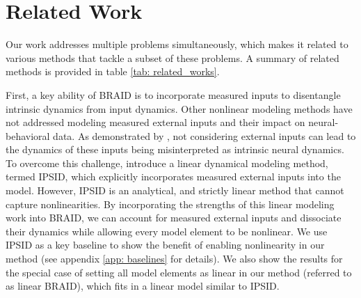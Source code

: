 \documentclass{article} %
\newcommand{\ourmethod}{BRAID}
\newcommand{\ourmethodlinear}{linear \ourmethod}
\begin{document}
\section{Related Work}\label{sec: related_work}
Our work addresses multiple problems simultaneously, which makes it related to various methods that tackle a subset of these problems. A summary of related methods is provided in table \ref{tab: related_works}.

First, a key ability of \ourmethod{} is to incorporate measured inputs to disentangle intrinsic dynamics from input dynamics. Other nonlinear modeling methods \citep{gao2016linear, sussillo2016making, wu2017gaussian, pandarinath2018inferring, rutten2020non, hurwitz2021targeted, kim2021inferring, abbaspourazad2024dynamical, sani2024dissociative} have not addressed modeling measured external inputs and their impact on neural-behavioral data. As demonstrated by \citet{vahidi2024modeling}, not considering external inputs can lead to the dynamics of these inputs being misinterpreted as intrinsic neural dynamics. To overcome this challenge, \cite{vahidi2024modeling} introduce a linear dynamical modeling method, termed IPSID, which explicitly incorporates measured external inputs into the model. However, IPSID is an analytical, and strictly linear method that cannot capture nonlinearities. By incorporating the strengths of this linear modeling work into \ourmethod{}, we can account for measured external inputs and dissociate their dynamics while allowing every model element to be nonlinear. We use IPSID as a key baseline to show the benefit of enabling nonlinearity in our method (see appendix \ref{app: baselines} for details). We also show the results for the special case of setting all model elements as linear in our method (referred to as \ourmethodlinear{}), which fits in a linear model similar to IPSID. 
\end{document}
